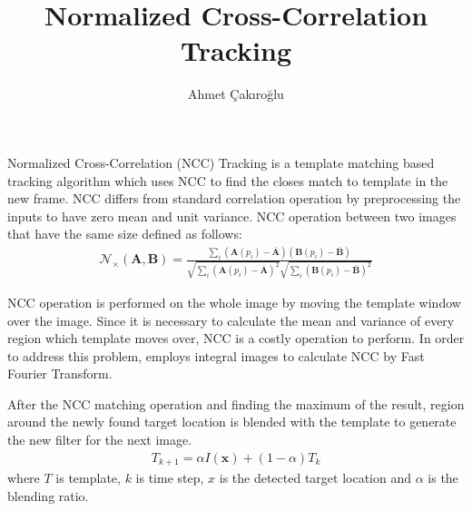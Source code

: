 \documentclass{article}
\title{Normalized Cross-Correlation Tracking}
\author{Ahmet Çakıroğlu}
\date{}
\begin{document}
\maketitle
Normalized Cross-Correlation (NCC) Tracking is a template matching based tracking algorithm which uses NCC to find the closes match to template in the new frame. NCC differs from standard correlation operation by preprocessing the inputs to have zero mean and unit variance. NCC operation between two images that have the same size defined as follows:
\begin{gather}
\mathcal{N}_\times(\boldsymbol{A},\boldsymbol{B}) = \frac{\sum_i (\boldsymbol{A}(p_i)-\bar{\boldsymbol{A}})(\boldsymbol{B}(p_i)-\bar{\boldsymbol{B}})}{\sqrt{\sum_i(\boldsymbol{A}(p_i)-\bar{\boldsymbol{A}})^2}\sqrt{\sum_i(\boldsymbol{B}(p_i)-\bar{\boldsymbol{B}})^2}}
\end{gather} 

NCC operation is performed on the whole image by moving the template window over the image. Since it is necessary to calculate the mean and variance of every region which template moves over, NCC is a costly operation to perform. In order to address this problem, \cite{lewis1995fast} employs integral images to calculate NCC by Fast Fourier Transform.

After the NCC matching operation and finding the maximum of the result, region around the newly found target location is blended with the template to generate the new filter for the next image.
\begin{gather}
T_{k+1} = \alpha I(\boldsymbol{x}) + (1-\alpha)T_k
\end{gather} 
where $T$ is template, $k$ is time step, $x$ is the detected target location and $\alpha$ is the blending ratio.



\end{document}
